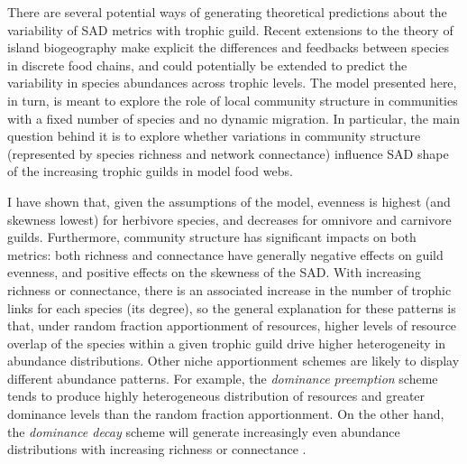 There are several potential ways of generating theoretical predictions about the variability of SAD metrics with trophic guild. Recent extensions to the theory of island biogeography \citep{Holt2009a, Gravel2011} make explicit the differences and feedbacks between species in discrete food chains, and could potentially be extended to predict the variability in species abundances across trophic levels. The model presented here, in turn, is meant to explore the role of local community structure in communities with a fixed number of species and no dynamic migration. In particular, the main question behind it is to explore whether variations in community structure (represented by species richness and network connectance) influence SAD shape of the increasing trophic guilds in model food webs.

I have shown that, given the assumptions of the model, evenness is highest (and skewness lowest) for herbivore species, and decreases for omnivore and carnivore guilds. Furthermore, community structure has significant impacts on both metrics: both richness and connectance have generally negative effects on guild evenness, and positive effects on the skewness of the SAD. With increasing richness or connectance, there is an associated increase in the number of trophic links for each species (its degree), so the general explanation for these patterns is that, under random fraction apportionment of resources, higher levels of resource overlap of the species within a given trophic guild drive higher heterogeneity in abundance distributions. Other niche apportionment schemes are likely to display different abundance patterns. For example, the \textit{dominance preemption} scheme tends to produce highly heterogeneous distribution of resources and greater dominance levels than the random fraction apportionment. On the other hand, the \textit{dominance decay} scheme will generate increasingly even abundance distributions with increasing richness or connectance \citep{Tokeshi1990}.


